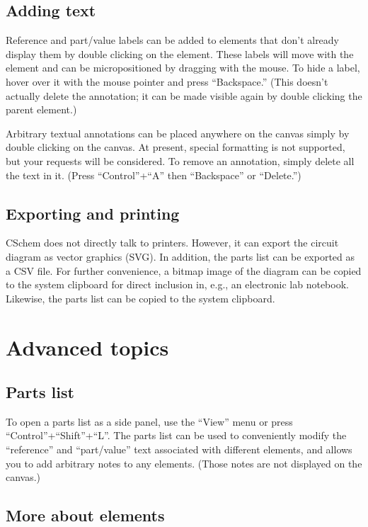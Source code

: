 \documentclass[11pt]{report}
\begin{document}
\section{Adding text}

Reference and part/value labels can be added to elements that don't
already display them by double clicking on the element. These labels
will move with the element and can be micropositioned by dragging with
the mouse. To hide a label, hover over it with the mouse pointer and
press ``Backspace.'' (This doesn't actually delete the annotation; it
can be made visible again by double clicking the parent element.)

Arbitrary textual annotations can be placed anywhere on the canvas
simply by double clicking on the canvas. At present, special
formatting is not supported, but your requests will be considered. To
remove an annotation, simply delete all the text in it. (Press
``Control''+``A'' then ``Backspace'' or ``Delete.'')

\section{Exporting and printing}

CSchem does not directly talk to printers. However, it can export the
circuit diagram as vector graphics
(SVG). In addition, the parts list can be exported as a CSV file. For
further convenience, a bitmap image of the diagram can be copied to
the system clipboard for direct inclusion in, e.g., an electronic lab
notebook. Likewise, the parts list can be copied to the system clipboard.

\chapter{Advanced topics}

\section{Parts list}

To open a parts list as a side panel, use the ``View'' menu or press
``Control''+``Shift''+``L''. The parts list can be used to
conveniently modify the ``reference'' and ``part/value'' text
associated with different elements, and allows you to add arbitrary
notes to any elements. (Those notes are not displayed on the canvas.)

\section{More about elements}
\end{document}
